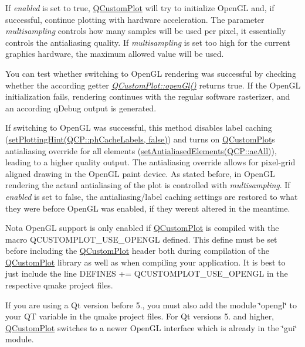 If {\itshape enabled} is set to true, \hyperlink{class_q_custom_plot}{Q\+Custom\+Plot} will try to initialize Open\+GL and, if successful, continue plotting with hardware acceleration. The parameter {\itshape multisampling} controls how many samples will be used per pixel, it essentially controls the antialiasing quality. If {\itshape multisampling} is set too high for the current graphics hardware, the maximum allowed value will be used.

You can test whether switching to Open\+GL rendering was successful by checking whether the according getter {\itshape \hyperlink{class_q_custom_plot_ab81fd5b380574c6dee92b6d8c8fd1b18}{Q\+Custom\+Plot\+::open\+Gl()}} returns true. If the Open\+GL initialization fails, rendering continues with the regular software rasterizer, and an according q\+Debug output is generated.

If switching to Open\+GL was successful, this method disables label caching (\hyperlink{class_q_custom_plot_a3b7c97bb6c16464e9e15190c07abe9a9}{set\+Plotting\+Hint(Q\+CP\+:\+:ph\+Cache\+Labels, false)}) and turns on \hyperlink{class_q_custom_plot}{Q\+Custom\+Plot}\textquotesingle{}s antialiasing override for all elements (\hyperlink{class_q_custom_plot_af6f91e5eab1be85f67c556e98c3745e8}{set\+Antialiased\+Elements(Q\+CP\+:\+:ae\+All)}), leading to a higher quality output. The antialiasing override allows for pixel-\/grid aligned drawing in the Open\+GL paint device. As stated before, in Open\+GL rendering the actual antialiasing of the plot is controlled with {\itshape multisampling}. If {\itshape enabled} is set to false, the antialiasing/label caching settings are restored to what they were before Open\+GL was enabled, if they weren\textquotesingle{}t altered in the meantime.

\begin{DoxyNote}{Nota}
Open\+GL support is only enabled if \hyperlink{class_q_custom_plot}{Q\+Custom\+Plot} is compiled with the macro {\ttfamily Q\+C\+U\+S\+T\+O\+M\+P\+L\+O\+T\+\_\+\+U\+S\+E\+\_\+\+O\+P\+E\+N\+GL} defined. This define must be set before including the \hyperlink{class_q_custom_plot}{Q\+Custom\+Plot} header both during compilation of the \hyperlink{class_q_custom_plot}{Q\+Custom\+Plot} library as well as when compiling your application. It is best to just include the line {\ttfamily D\+E\+F\+I\+N\+ES += Q\+C\+U\+S\+T\+O\+M\+P\+L\+O\+T\+\_\+\+U\+S\+E\+\_\+\+O\+P\+E\+N\+GL} in the respective qmake project files. 

If you are using a Qt version before 5., you must also add the module \char`\"{}opengl\char`\"{} to your {\ttfamily QT} variable in the qmake project files. For Qt versions 5. and higher, \hyperlink{class_q_custom_plot}{Q\+Custom\+Plot} switches to a newer Open\+GL interface which is already in the \char`\"{}gui\char`\"{} module. 
\end{DoxyNote}
